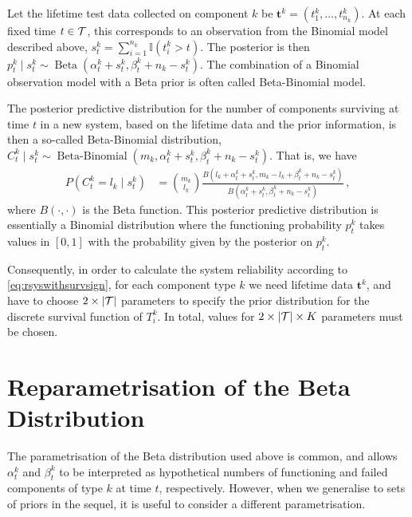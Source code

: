 \documentclass[12pt, a4paper]{elsarticle}
\newcommand{\bs}[1]{\boldsymbol{#1}}
\renewcommand{\vec}[1]{{\bs#1}}
\newcommand{\indic}{\mathbb{I}}
\newcommand{\be}{\operatorname{Beta}}
\newcommand{\bebin}{\operatorname{Beta-Binomial}}
\newcommand{\ptk}{p^k_t}
\begin{document}
Let the lifetime test data collected on component $k$ be $\vec{t}^k = (t^k_1, \ldots, t^k_{n_k})$.
At each fixed time $t \in {\cal T}$, this corresponds to an observation from the Binomial model described above,
$s^k_t = \sum_{i=1}^{n_k} \indic(t^k_i > t)$.
The posterior is then $\ptk \mid s^k_t \sim \be(\alpha^k_t + s^k_t, \beta^k_t + n_k - s^k_t)$.
The combination of a Binomial observation model with a Beta prior is often called Beta-Binomial model.

The posterior predictive distribution for the number of components surviving at time $t$
in a new system, based on the lifetime data and the prior information,
is then a so-called Beta-Binomial distribution,
$C^k_t \mid s^k_t \sim \bebin(m_k, \alpha^k_t + s^k_t, \beta^k_t + n_k - s^k_t)$.
That is, we have
\begin{align*}
P(C^k_t = l_k \mid s^k_t) &= {m_k \choose l_k} \frac{B(l_k + \alpha^k_t + s^k_t, m_k - l_k + \beta^k_t + n_k - s^k_t)}
                                                    {B(\alpha^k_t + s^k_t, \beta^k_t + n_k - s^k_t)} \,,
\end{align*}
where $B(\cdot, \cdot)$ is the Beta function.
This posterior predictive distribution is essentially a Binomial distribution
where the functioning probability $\ptk$ takes values in $[0,1]$
with the probability given by the posterior on $\ptk$.

Consequently, in order to calculate the system reliability according to \eqref{eq:rsyswithsurvsign},
for each component type $k$
we need lifetime data $\vec{t}^k$,
and have to choose $2 \times |{\cal T}|$ parameters
to specify the prior distribution for the discrete survival function of $T^k_i$.
In total, values for $2 \times |{\cal T}| \times K$ parameters must be chosen.


\section{Reparametrisation of the Beta Distribution}

The parametrisation of the Beta distribution used above is common,
and allows $\alpha^k_t$ and $\beta^k_t$ to be interpreted as
hypothetical numbers of functioning and failed components of type $k$ at time $t$, respectively.
However, when we generalise to sets of priors in the sequel,
it is useful to consider a different parametrisation.
\end{document}
